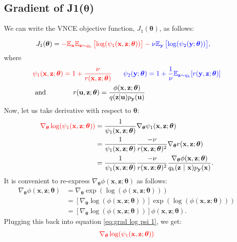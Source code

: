 \documentclass[11pt, oneside]{article}
\newcommand{\thetab}{{\boldsymbol{\theta}}}
\newcommand{\pnn}{\phi}
\newcommand{\pnoise}{p_{ \mathbf y}}
\renewcommand{\u}{{\mathbf u}}
\newcommand{\x}{{\mathbf x}}
\newcommand{\y}{{\mathbf y}}
\newcommand{\z}{{\mathbf z}}
\theoremstyle{definition}
\begin{document}
{\subsection{Gradient of J1($\thetab$)}
\label{sec:appendix grad of J1}
We can write the VNCE objective function, $J_1(\thetab)$, as follows:

\begin{align}
J_1(\thetab) & =  
              \color{red}{ - \mathbb{E}_{\x} \mathbb{E}_{\z \sim q_k} \left[ \log(\psi_1(\x, \z; \thetab)) \right]} -        \color{blue}{ \nu \mathbb{E}_{\y}  \left[  \log(\psi_2(\y; \thetab)) \right]},
\end{align}
where
\begin{align}
&\color{red}{\psi_1(\x, \z; \thetab) = 1 + \frac{\nu}{r(\x, \z; \thetab)}} \ \ \ \ \ \color{blue}{\psi_2(\y; \thetab) = 1 + \frac{1}{\nu} \mathbb{E}_{\z \sim q_k}[r(\y, \z; \thetab)]} \\
&\text{ and } \ \ \ \ \ \ \ \ \ \ \ r(\u, \z; \thetab) = \frac{\pnn(\x, \z ; \thetab)}{q(\z | \u) \pnoise(\u)}
\end{align}
Now, let us take derivative with respect to $\thetab$:
\begin{align}
\color{red}{ \nabla_{\thetab} \log(\psi_1(\x, \z; \thetab))}
           & = \frac{1}{\psi_1(\x, \z; \thetab)} \nabla_{\thetab} \psi_1(\x, \z; \thetab) \\
           & = \frac{1}{\psi_1(\x, \z; \thetab)} \frac{-\nu}{r(\x, \z; \thetab)^2} \nabla_{\thetab} r(\x, \z; \thetab) \\
           & = \frac{1}{\psi_1(\x, \z; \thetab)} \frac{-\nu}{r(\x, \z; \thetab)^2} \frac{\nabla_{\thetab} \phi(\x, \z; \thetab)}{q_k(\z \ | \ \x)p_{\y}(\x)}.
           \label{eq:grad log psi 1}
\end{align}
It is convenient to re-express $\nabla_{\thetab} \phi(\x, \z; \thetab)$ as follows:
\begin{align}
\nabla_{\thetab} \phi(\x, \z; \thetab) & = \nabla_{\thetab} \exp ( \log ( \phi(\x, \z; \thetab) ) ) \\
          & = \left[ \nabla_{\thetab} \log(\phi(\x, \z; \thetab)) \right] \exp ( \log ( \phi(\x, \z; \thetab) ) )\\
          & = \left[ \nabla_{\thetab} \log(\phi(\x, \z; \thetab)) \right] \phi(\x, \z; \thetab).
\end{align}
Plugging this back into equation \ref{eq:grad log psi 1}, we get:
\begin{align}
\color{red}{ \nabla_{\thetab} \log(\psi_1(\x, \z; \thetab))}

\end{align}}
\end{document}
